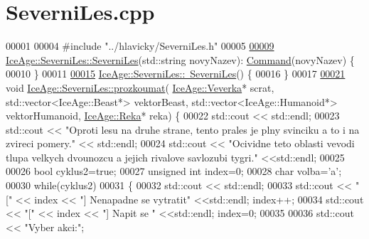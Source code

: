 \hypertarget{SeverniLes_8cpp_source}{}\section{Severni\+Les.\+cpp}
\label{SeverniLes_8cpp_source}

\begin{DoxyCode}
00001 
00004 \textcolor{preprocessor}{#include "../hlavicky/SeverniLes.h"}
00005 
\hypertarget{SeverniLes_8cpp_source.tex_l00009}{}\hyperlink{classIceAge_1_1SeverniLes_accad5e1d48610aabeef941f2ba182832}{00009} \hyperlink{classIceAge_1_1SeverniLes_accad5e1d48610aabeef941f2ba182832}{IceAge::SeverniLes::SeverniLes}(std::string novyNazev):
      \hyperlink{classIceAge_1_1Command}{Command}(novyNazev) \{
00010 \}
00011 
\hypertarget{SeverniLes_8cpp_source.tex_l00015}{}\hyperlink{classIceAge_1_1SeverniLes_abfc44ad357a1eeb29a0aead797dfe6b8}{00015} \hyperlink{classIceAge_1_1SeverniLes_abfc44ad357a1eeb29a0aead797dfe6b8}{IceAge::SeverniLes::~SeverniLes}() \{
00016 \}
00017 
\hypertarget{SeverniLes_8cpp_source.tex_l00021}{}\hyperlink{classIceAge_1_1SeverniLes_a59fd82f865c7b89988752f16b0e10322}{00021} \textcolor{keywordtype}{void} \hyperlink{classIceAge_1_1SeverniLes_a59fd82f865c7b89988752f16b0e10322}{IceAge::SeverniLes::prozkoumat}(
      \hyperlink{classIceAge_1_1Veverka}{IceAge::Veverka}* scrat, std::vector<IceAge::Beast*> vektorBeast, 
      std::vector<IceAge::Humanoid*> vektorHumanoid, \hyperlink{classIceAge_1_1Reka}{IceAge::Reka}* reka) \{
00022     std::cout << std::endl;
00023     std::cout << \textcolor{stringliteral}{"Oproti lesu na druhe strane, tento prales je plny svinciku a to i na zvireci pomery."} << 
      std::endl;
00024     std::cout << \textcolor{stringliteral}{"Ocividne teto oblasti vevodi tlupa velkych dvounozcu a jejich rivalove savlozubi tygri."} 
      <<std::endl;
00025 
00026     \textcolor{keywordtype}{bool} cyklus2=\textcolor{keyword}{true};
00027     \textcolor{keywordtype}{unsigned} \textcolor{keywordtype}{int} index=0;
00028     \textcolor{keywordtype}{char} volba=\textcolor{charliteral}{'a'};
00030     \textcolor{keywordflow}{while}(cyklus2)
00031     \{
00032         std::cout << std::endl;
00033         std::cout << \textcolor{stringliteral}{"["} << index << \textcolor{stringliteral}{"] Nenapadne se vytratit"} <<std::endl; index++;
00034         std::cout << \textcolor{stringliteral}{"["} << index << \textcolor{stringliteral}{"] Napit se "} <<std::endl; index=0;
00035 
00036         std::cout << \textcolor{stringliteral}{"Vyber akci:"};

\end{DoxyCode}
